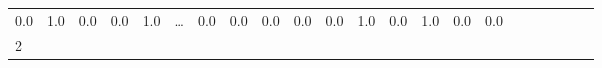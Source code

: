 \documentclass[
  brazilian,
]{article}
\begin{document}
\begin{longtable}[]{@{}llllllllllllllllllllll@{}}
\begin{minipage}[t]{0.02\columnwidth}
0.0\strut
\end{minipage} & \begin{minipage}[t]{0.02\columnwidth}\raggedright
1.0\strut
\end{minipage} & \begin{minipage}[t]{0.03\columnwidth}\raggedright
0.0\strut
\end{minipage} & \begin{minipage}[t]{0.02\columnwidth}\raggedright
0.0\strut
\end{minipage} & \begin{minipage}[t]{0.03\columnwidth}\raggedright
1.0\strut
\end{minipage} & \begin{minipage}[t]{0.02\columnwidth}\raggedright
\ldots{}\strut
\end{minipage} & \begin{minipage}[t]{0.02\columnwidth}\raggedright
0.0\strut
\end{minipage} & \begin{minipage}[t]{0.03\columnwidth}\raggedright
0.0\strut
\end{minipage} & \begin{minipage}[t]{0.02\columnwidth}\raggedright
0.0\strut
\end{minipage} & \begin{minipage}[t]{0.02\columnwidth}\raggedright
0.0\strut
\end{minipage} & \begin{minipage}[t]{0.02\columnwidth}\raggedright
0.0\strut
\end{minipage} & \begin{minipage}[t]{0.02\columnwidth}\raggedright
1.0\strut
\end{minipage} & \begin{minipage}[t]{0.02\columnwidth}\raggedright
0.0\strut
\end{minipage} & \begin{minipage}[t]{0.02\columnwidth}\raggedright
1.0\strut
\end{minipage} & \begin{minipage}[t]{0.03\columnwidth}\raggedright
0.0\strut
\end{minipage} & \begin{minipage}[t]{0.02\columnwidth}\raggedright
0.0\strut
\end{minipage}\tabularnewline
\begin{minipage}[t]{0.01\columnwidth}\raggedright
2\strut
\end{minipage} & \begin{minipage}[t]{0.03\columnwidth}\raggedright

\end{minipage}
\end{longtable}
\end{document}
